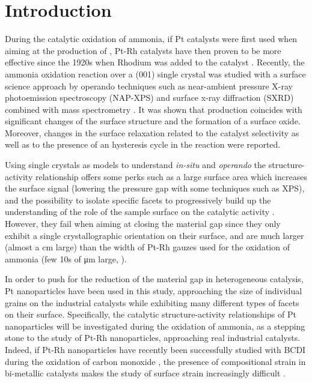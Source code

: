 \section{Introduction}

During the catalytic oxidation of ammonia, if Pt catalysts were first used when aiming at the production of , Pt-Rh catalysts have then proven to be more effective since the 1920s when Rhodium was added to the catalyst \parencite{Handforth1934, Heck1982}.
Recently, the ammonia oxidation reaction over a (001) single crystal was studied with a surface science approach by operando techniques such as near-ambient pressure X-ray photoemission spectroscopy (NAP-XPS) and surface x-ray diffraction (SXRD) combined with mass spectrometry \parencite{Resta2020a}.
It was shown that  production coincides with significant changes of the surface structure and the formation of a  surface oxide.
Moreover, changes in the surface relaxation related to the catalyst selectivity as well as to the presence of an hysteresis cycle in the reaction were reported.

Using single crystals as models to understand \textit{in-situ} and \textit{operando} the structure-activity relationship offers some perks such as a large surface area which increases the surface signal (lowering the pressure gap with some techniques such as XPS), and the possibility to isolate specific facets to progressively build up the understanding of the role of the sample surface on the catalytic activity \parencite{Hejral2016, Resta2020a}.
However, they fail when aiming at closing the material gap since they only exhibit a single crystallographic orientation on their surface, and are much larger (almost a \unit{cm} large) than the width of Pt-Rh gauzes used for the oxidation of ammonia (few 10s of \unit{\micro\meter} large, \cite{Kaiser1909}).

In order to push for the reduction of the material gap in heterogeneous catalysis, Pt nanoparticles have been used in this study, approaching the size of individual grains on the industrial catalysts while exhibiting many different types of facets on their surface.
Specifically, the catalytic structure-activity relationships of Pt nanoparticles will be investigated during the oxidation of ammonia, as a stepping stone to the study of Pt-Rh nanoparticles, approaching real industrial catalysts.
Indeed, if Pt-Rh nanoparticles have recently been successfully studied with BCDI during the oxidation of carbon monoxide \parencite{Kim2021}, the presence of compositional strain in bi-metallic catalysts makes the study of surface strain increasingly difficult \parencite{Kawaguchi2019}.

